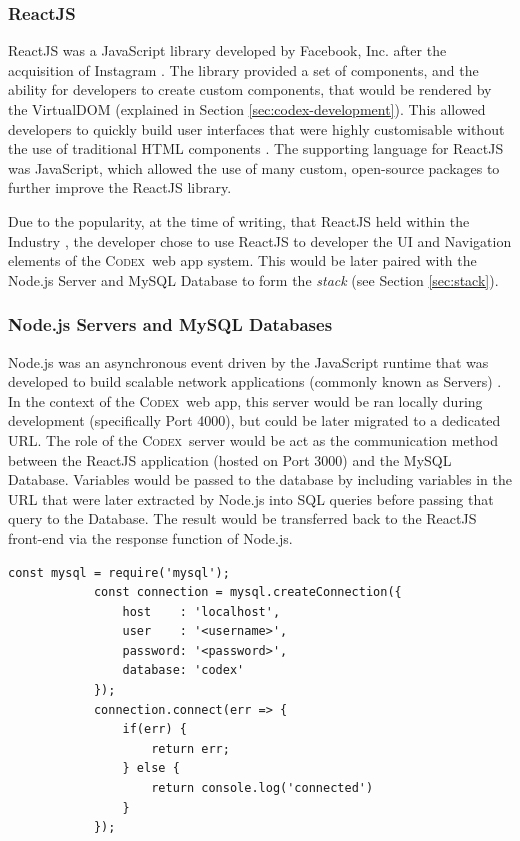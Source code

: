 \documentclass[final]{cmpreport}
\newcommand{\Codex}{\textsc{Codex}}
\begin{document}
			\subsubsection{ReactJS} \label{sec:react-js}
			ReactJS was a JavaScript library developed by Facebook, Inc. after the acquisition of Instagram \citep{ReactJSOfficial}. The library provided a set of components, and the ability for developers to create custom components, that would be rendered by the VirtualDOM (explained in Section \ref{sec:codex-development}). This allowed developers to quickly build user interfaces that were highly customisable without the use of traditional HTML components \citep{MasteringReact}. The supporting language for ReactJS was JavaScript, which allowed the use of many custom, open-source packages to further improve the ReactJS library.  
			
			Due to the popularity, at the time of writing, that ReactJS held within the Industry \citep{ReactJSPopularity}, the developer chose to use ReactJS to developer the UI and Navigation elements of the \Codex \ web app system. This would be later paired with the Node.js Server and MySQL Database to form the \emph{stack} (see Section \ref{sec:stack}).
			
			\subsubsection{Node.js Servers and MySQL Databases} \label{sec:backend}
			Node.js was an asynchronous event driven by the JavaScript runtime that was developed to build scalable network applications (commonly known as Servers) \citep{nodejsOfficial}. In the context of the \Codex \ web app, this server would be ran locally during development (specifically Port 4000), but could be later migrated to a dedicated URL. The role of the \Codex \ server would be act as the communication method between the ReactJS application (hosted on Port 3000) and the MySQL Database. Variables would be passed to the database by including variables in the URL that were later extracted by Node.js into SQL queries before passing that query to the Database. The result would be transferred back to the ReactJS front-end via the response function of Node.js.
			
			\begin{lstlisting}[caption={Node.js source code which was used to connect the Node.js Sever to the MySQL Database, forming the back-end of the application.}, label={cod:db-connect}]
			const mysql = require('mysql');
			const connection = mysql.createConnection({
				host	: 'localhost',
				user	: '<username>',
				password: '<password>',
				database: 'codex'	
			});
			connection.connect(err => {
				if(err) {
					return err;
				} else {
					return console.log('connected')
				}
			});
			\end{lstlisting}
			
\end{document}
